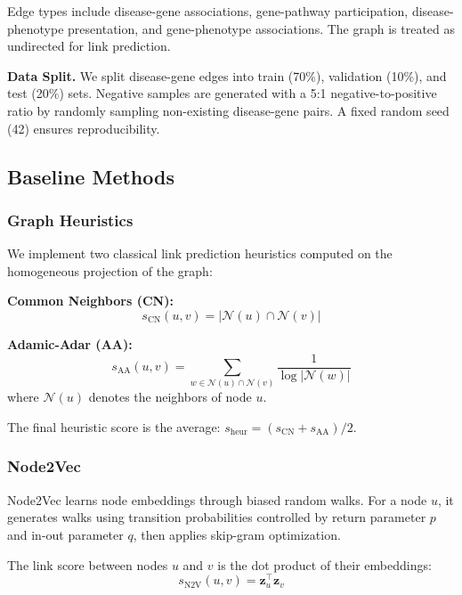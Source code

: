 \documentclass[11pt]{article}
\newcommand{\vect}[1]{\mathbf{#1}}
\newcommand{\set}[1]{\mathcal{#1}}
\begin{document}
Edge types include disease-gene associations, gene-pathway participation, disease-phenotype presentation, and gene-phenotype associations. The graph is treated as undirected for link prediction.

\textbf{Data Split.} We split disease-gene edges into train (70\%), validation (10\%), and test (20\%) sets. Negative samples are generated with a 5:1 negative-to-positive ratio by randomly sampling non-existing disease-gene pairs. A fixed random seed (42) ensures reproducibility.

\subsection{Baseline Methods}

\subsubsection{Graph Heuristics}

We implement two classical link prediction heuristics computed on the homogeneous projection of the graph:

\textbf{Common Neighbors (CN):}
\begin{equation}
    s_{\text{CN}}(u, v) = |\set{N}(u) \cap \set{N}(v)|
\end{equation}

\textbf{Adamic-Adar (AA):}
\begin{equation}
    s_{\text{AA}}(u, v) = \sum_{w \in \set{N}(u) \cap \set{N}(v)} \frac{1}{\log |\set{N}(w)|}
\end{equation}
where $\set{N}(u)$ denotes the neighbors of node $u$.

The final heuristic score is the average: $s_{\text{heur}} = (s_{\text{CN}} + s_{\text{AA}})/2$.

\subsubsection{Node2Vec}

Node2Vec \citep{grover2016node2vec} learns node embeddings through biased random walks. For a node $u$, it generates walks using transition probabilities controlled by return parameter $p$ and in-out parameter $q$, then applies skip-gram optimization.

The link score between nodes $u$ and $v$ is the dot product of their embeddings:
\begin{equation}
    s_{\text{N2V}}(u, v) = \vect{z}_u^\top \vect{z}_v
\end{equation}
\end{document}
